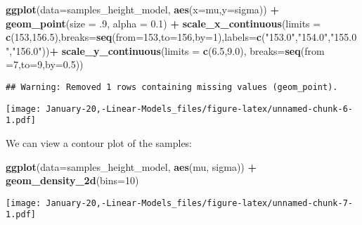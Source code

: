 \documentclass[]{article}
\newenvironment{Shaded}{\begin{snugshade}}{\end{snugshade}}
\newcommand{\DataTypeTok}[1]{\textcolor[rgb]{0.13,0.29,0.53}{#1}}
\newcommand{\DecValTok}[1]{\textcolor[rgb]{0.00,0.00,0.81}{#1}}
\newcommand{\FloatTok}[1]{\textcolor[rgb]{0.00,0.00,0.81}{#1}}
\newcommand{\KeywordTok}[1]{\textcolor[rgb]{0.13,0.29,0.53}{\textbf{#1}}}
\newcommand{\NormalTok}[1]{#1}
\newcommand{\OperatorTok}[1]{\textcolor[rgb]{0.81,0.36,0.00}{\textbf{#1}}}
\newcommand{\StringTok}[1]{\textcolor[rgb]{0.31,0.60,0.02}{#1}}
\begin{document}
\begin{Shaded}
\begin{Highlighting}[]
\KeywordTok{ggplot}\NormalTok{(}\DataTypeTok{data=}\NormalTok{samples_height_model, }\KeywordTok{aes}\NormalTok{(}\DataTypeTok{x=}\NormalTok{mu,}\DataTypeTok{y=}\NormalTok{sigma)) }\OperatorTok{+}\StringTok{ }
\StringTok{  }\KeywordTok{geom_point}\NormalTok{(}\DataTypeTok{size =} \FloatTok{.9}\NormalTok{, }\DataTypeTok{alpha =} \FloatTok{0.1}\NormalTok{) }\OperatorTok{+}
\StringTok{  }\KeywordTok{scale_x_continuous}\NormalTok{(}\DataTypeTok{limits =} \KeywordTok{c}\NormalTok{(}\DecValTok{153}\NormalTok{,}\FloatTok{156.5}\NormalTok{),}\DataTypeTok{breaks=}\KeywordTok{seq}\NormalTok{(}\DataTypeTok{from=}\DecValTok{153}\NormalTok{,}\DataTypeTok{to=}\DecValTok{156}\NormalTok{,}\DataTypeTok{by=}\DecValTok{1}\NormalTok{),}\DataTypeTok{labels=}\KeywordTok{c}\NormalTok{(}\StringTok{"153.0"}\NormalTok{,}\StringTok{"154.0"}\NormalTok{,}\StringTok{"155.0"}\NormalTok{,}\StringTok{"156.0"}\NormalTok{))}\OperatorTok{+}
\StringTok{  }\KeywordTok{scale_y_continuous}\NormalTok{(}\DataTypeTok{limits =} \KeywordTok{c}\NormalTok{(}\FloatTok{6.5}\NormalTok{,}\FloatTok{9.0}\NormalTok{), }\DataTypeTok{breaks=}\KeywordTok{seq}\NormalTok{(}\DataTypeTok{from =}\DecValTok{7}\NormalTok{,}\DataTypeTok{to=}\DecValTok{9}\NormalTok{,}\DataTypeTok{by=}\FloatTok{0.5}\NormalTok{))}
\end{Highlighting}
\end{Shaded}

\begin{verbatim}
## Warning: Removed 1 rows containing missing values (geom_point).
\end{verbatim}

\texttt{[image: January-20,-Linear-Models\_files/figure-latex/unnamed-chunk-6-1.pdf]}

We can view a contour plot of the samples:

\begin{Shaded}
\begin{Highlighting}[]
\KeywordTok{ggplot}\NormalTok{(}\DataTypeTok{data=}\NormalTok{samples_height_model, }\KeywordTok{aes}\NormalTok{(mu, sigma)) }\OperatorTok{+}
\StringTok{  }\KeywordTok{geom_density_2d}\NormalTok{(}\DataTypeTok{bins=}\DecValTok{10}\NormalTok{) }
\end{Highlighting}
\end{Shaded}

\texttt{[image: January-20,-Linear-Models\_files/figure-latex/unnamed-chunk-7-1.pdf]}
\end{document}
